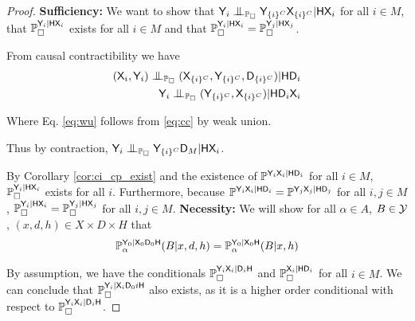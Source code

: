 \begin{proof}
\textbf{Sufficiency:}
We want to show that $\RV{Y}_i\CI_{\prob{P}_\square} \RV{Y}_{\{i\}^C}\RV{X}_{\{i\}^C} |\RV{H}\RV{X}_i$ for all $i\in M$, that $\mathbb{P}_\square^{\mathsf{Y}_i|\mathsf{H}\mathsf{X}_i}$ exists for all $i\in M$ and that $\mathbb{P}_\square^{\mathsf{Y}_i|\mathsf{H}\mathsf{X}_i}=\mathbb{P}_\square^{\mathsf{Y}_j|\mathsf{H}\mathsf{X}_j}$.

From causal contractibility we have
\begin{align}
(\RV{X}_i,\RV{Y}_i)\CI_{\prob{P}_\square} (\RV{X}_{\{i\}^C},\RV{Y}_{\{i\}^C},\RV{D}_{\{i\}^C}) |\RV{H}\RV{D}_i\label{eq:cc}\\
\RV{Y}_i\CI_{\prob{P}_\square} (\RV{Y}_{\{i\}^C},\RV{X}_{\{i\}^C}) |\RV{H}\RV{D}_i\RV{X}_i\label{eq:wu}
\end{align}

Where Eq. \ref{eq:wu} follows from \ref{eq:cc} by weak union.

Thus by contraction, $\RV{Y}_i\CI_{\prob{P}_\square} \RV{Y}_{\{i\}^C}\RV{D}_{M} |\RV{H}\RV{X}_i$.

By Corollary \ref{cor:ci_cp_exist} and the existence of $\mathbb{P}^{\mathsf{Y}_i\mathsf{X}_i|\mathsf{H}\mathsf{D}_i}$ for all $i\in M$, $\mathbb{P}_\square^{\mathsf{Y}_i|\mathsf{H}\mathsf{X}_i}$ exists for all $i$. Furthermore, because $\mathbb{P}^{\mathsf{Y}_i\mathsf{X}_i|\mathsf{H}\mathsf{D}_i}=\mathbb{P}^{\mathsf{Y}_j\mathsf{X}_j|\mathsf{H}\mathsf{D}_j}$ for all $i,j\in M$, $\mathbb{P}_\square^{\mathsf{Y}_i|\mathsf{H}\mathsf{X}_i}=\mathbb{P}_\square^{\mathsf{Y}_j|\mathsf{H}\mathsf{X}_j}$ for all $i,j\in M$.
\textbf{Necessity:}
We will show for all $\alpha\in A$, $B\in \mathcal{Y}$, $(x,d,h)\in X\times D\times H$ that 
\begin{align}
    \mathbb{P}_\alpha^{\mathsf{Y}_0|\mathsf{X}_0\mathsf{D}_0\mathsf{H}}(B|x,d,h)=\mathbb{P}_\alpha^{\mathsf{Y}_0|\mathsf{X}_0\mathsf{H}}(B|x,h)
\end{align}

By assumption, we have the conditionals $\mathbb{P}_\square^{\mathsf{Y}_i\mathsf{X}_i|\mathsf{D}_i\mathsf{H}}$ and $\mathbb{P}_\square^{\mathsf{X}_i|\mathsf{H}\mathsf{D}_i}$ for all $i\in M$. We can conclude that $\mathbb{P}_\square^{\mathsf{Y}_i|\mathsf{X}_i\mathsf{D}_0i\mathsf{H}}$ also exists, as it is a higher order conditional with respect to $\mathbb{P}_\square^{\mathsf{Y}_i\mathsf{X}_i|\mathsf{D}_i\mathsf{H}}$.


\end{proof}
